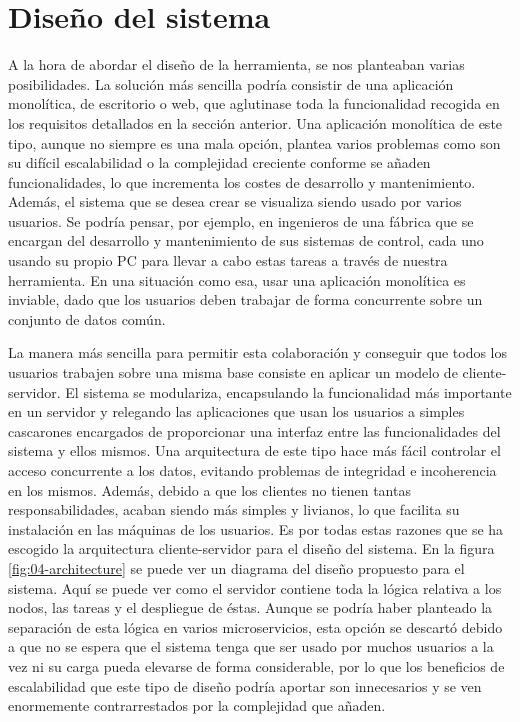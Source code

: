 \section{Diseño del sistema}

A la hora de abordar el diseño de la herramienta, se nos planteaban varias
posibilidades. La solución más sencilla podría consistir de una aplicación
monolítica, de escritorio o web, que aglutinase toda la funcionalidad recogida
en los requisitos detallados en la sección anterior. Una aplicación monolítica
de este tipo, aunque no siempre es una mala opción, plantea varios problemas
como son su difícil escalabilidad o la complejidad creciente conforme se añaden
funcionalidades, lo que incrementa los costes de desarrollo y mantenimiento.
Además, el sistema que se desea crear se visualiza siendo usado por varios
usuarios. Se podría pensar, por ejemplo, en ingenieros de una fábrica que se
encargan del desarrollo y mantenimiento de sus sistemas de control, cada uno
usando su propio PC para llevar a cabo estas tareas a través de nuestra
herramienta. En una situación como esa, usar una aplicación monolítica es
inviable, dado que los usuarios deben trabajar de forma concurrente sobre un
conjunto de datos común.

La manera más sencilla para permitir esta colaboración y conseguir que todos los
usuarios trabajen sobre una misma base consiste en aplicar un modelo de
cliente-servidor. El sistema se modulariza, encapsulando la funcionalidad más
importante en un servidor y relegando las aplicaciones que usan los usuarios a
simples cascarones encargados de proporcionar una interfaz entre las
funcionalidades del sistema y ellos mismos. Una arquitectura de este tipo hace
más fácil controlar el acceso concurrente a los datos, evitando problemas de
integridad e incoherencia en los mismos. Además, debido a que los clientes no
tienen tantas responsabilidades, acaban siendo más simples y livianos, lo que
facilita su instalación en las máquinas de los usuarios. Es por todas estas
razones que se ha escogido la arquitectura cliente-servidor para el diseño del
sistema. En la figura \ref{fig:04-architecture} se puede ver un diagrama del
diseño propuesto para el sistema. Aquí se puede ver como el servidor contiene
toda la lógica relativa a los nodos, las tareas y el despliegue de éstas. Aunque
se podría haber planteado la separación de esta lógica en varios microservicios,
esta opción se descartó debido a que no se espera que el sistema tenga que ser
usado por muchos usuarios a la vez ni su carga pueda elevarse de forma
considerable, por lo que los beneficios de escalabilidad que este tipo de diseño
podría aportar son innecesarios y se ven enormemente contrarrestados por la
complejidad que añaden.


